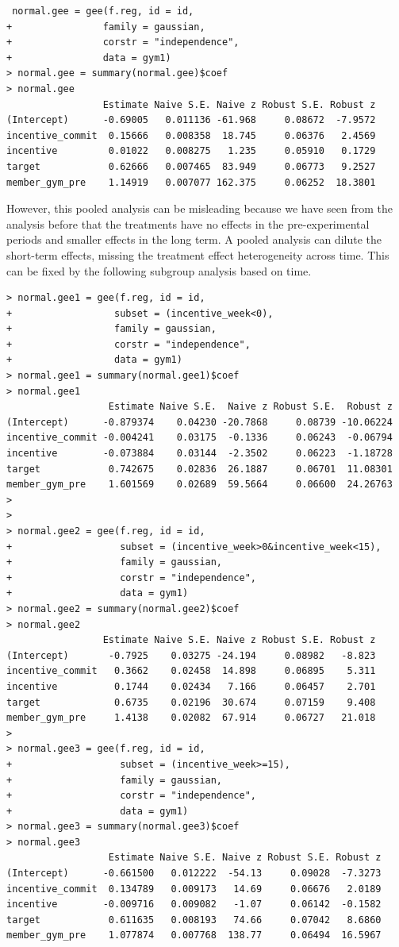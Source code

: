 \begin{lstlisting}
 normal.gee = gee(f.reg, id = id, 
+                family = gaussian, 
+                corstr = "independence", 
+                data = gym1)
> normal.gee = summary(normal.gee)$coef
> normal.gee
                 Estimate Naive S.E. Naive z Robust S.E. Robust z
(Intercept)      -0.69005   0.011136 -61.968     0.08672  -7.9572
incentive_commit  0.15666   0.008358  18.745     0.06376   2.4569
incentive         0.01022   0.008275   1.235     0.05910   0.1729
target            0.62666   0.007465  83.949     0.06773   9.2527
member_gym_pre    1.14919   0.007077 162.375     0.06252  18.3801
\end{lstlisting}

However, this pooled analysis can be misleading because we have seen from the analysis before that the treatments have no effects in the pre-experimental periods and smaller effects in the long term. A pooled analysis can dilute the short-term effects, missing the treatment effect heterogeneity across time. This can be fixed by the following subgroup analysis based on time.

\begin{lstlisting}
> normal.gee1 = gee(f.reg, id = id, 
+                  subset = (incentive_week<0),
+                  family = gaussian, 
+                  corstr = "independence", 
+                  data = gym1)
> normal.gee1 = summary(normal.gee1)$coef
> normal.gee1
                  Estimate Naive S.E.  Naive z Robust S.E.  Robust z
(Intercept)      -0.879374    0.04230 -20.7868     0.08739 -10.06224
incentive_commit -0.004241    0.03175  -0.1336     0.06243  -0.06794
incentive        -0.073884    0.03144  -2.3502     0.06223  -1.18728
target            0.742675    0.02836  26.1887     0.06701  11.08301
member_gym_pre    1.601569    0.02689  59.5664     0.06600  24.26763
>  
> 
> normal.gee2 = gee(f.reg, id = id, 
+                   subset = (incentive_week>0&incentive_week<15),
+                   family = gaussian, 
+                   corstr = "independence", 
+                   data = gym1)
> normal.gee2 = summary(normal.gee2)$coef  
> normal.gee2
                 Estimate Naive S.E. Naive z Robust S.E. Robust z
(Intercept)       -0.7925    0.03275 -24.194     0.08982   -8.823
incentive_commit   0.3662    0.02458  14.898     0.06895    5.311
incentive          0.1744    0.02434   7.166     0.06457    2.701
target             0.6735    0.02196  30.674     0.07159    9.408
member_gym_pre     1.4138    0.02082  67.914     0.06727   21.018
> 
> normal.gee3 = gee(f.reg, id = id, 
+                   subset = (incentive_week>=15),
+                   family = gaussian, 
+                   corstr = "independence", 
+                   data = gym1)
> normal.gee3 = summary(normal.gee3)$coef
> normal.gee3
                  Estimate Naive S.E. Naive z Robust S.E. Robust z
(Intercept)      -0.661500   0.012222  -54.13     0.09028  -7.3273
incentive_commit  0.134789   0.009173   14.69     0.06676   2.0189
incentive        -0.009716   0.009082   -1.07     0.06142  -0.1582
target            0.611635   0.008193   74.66     0.07042   8.6860
member_gym_pre    1.077874   0.007768  138.77     0.06494  16.5967
\end{lstlisting} 

